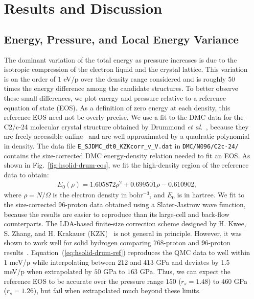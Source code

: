 \section{Results and Discussion}
\label{sec:hsolid-results}

\subsection{Energy, Pressure, and Local Energy Variance}

The dominant variation of the total energy as pressure increases is due to the isotropic compression of the electron liquid and the crystal lattice. This variation is on the order of $1$ eV/p over the density range considered and is roughly 50 times the energy difference among the candidate structures.
To better observe these small differences, we plot energy and pressure relative to a reference equation of state (EOS).
As a definition of zero energy at each density, this reference EOS need not be overly precise.
We use a fit to the DMC data for the C2/c-24 molecular crystal structure obtained by Drummond \textit{et al.}~\cite{Drummond2015}, because they are freely accessible online~\cite{drum-eos} and are well approximated by a quadratic polynomial in density.
The data file \verb|E_SJDMC_dt0_KZKcorr_v_V.dat| in \verb|DMC/N096/C2c-24/| contains the size-corrected DMC energy-density relation needed to fit an EOS.
As shown in Fig.~\ref{fig:hsolid-drum-eos}, we fit the high-density region of the reference data to obtain:
\begin{align}
E_0(\rho) = 1.605872\rho^2 + 0.699501\rho - 0.610902,
\label{eq:hsolid-drum-ref}
\end{align}
where $\rho=N/\Omega$ is the electron density in bohr$^{-3}$, and $E_0$ is in hartree.
We fit to the size-corrected 96-proton data obtained using a Slater-Jastrow wave function, because the results are easier to reproduce than its large-cell and back-flow counterparts.
The LDA-based finite-size correction scheme designed by H. Kwee, S. Zhang, and H. Krakauer (KZK)~\cite{Kwee2008} is not general in principle.
However, it was shown to work well for solid hydrogen comparing 768-proton and 96-proton results~\cite{Drummond2015}.
Equation~(\ref{eq:hsolid-drum-ref}) reproduces the QMC data to well within $1$ meV/p while interpolating between $212$ and $413$ GPa and deviates by $1.5$ meV/p when extrapolated by $50$ GPa to $163$ GPa.
Thus, we can expect the reference EOS to be accurate over the pressure range $150$ ($r_s=1.48$) to $460$ GPa ($r_s=1.26$), but fail when extrapolated much beyond these limits.

